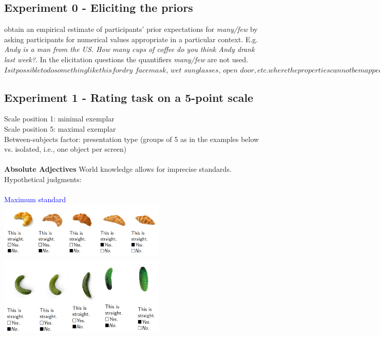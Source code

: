 \documentclass[fleqn,reqno,10pt]{article}
\begin{document}
\subsection{Experiment 0 - Eliciting the priors}

\citet{FrankeScholler2016:Semantic-values} obtain an empirical estimate of participants’ prior expectations for \textit{many/few} by asking participants for numerical values appropriate in a particular context. E.g. \textit{Andy is a man from the US. How many cups of coffee do you think Andy drank last week?}. In the elicitation questions the quantifiers \textit{many/few} are not used. \Rightarrow$
Is it possible to do something like this for \textit{dry facemask, wet sunglasses, open door}, etc. where the properties cannot be mapped onto a numerical scale?$

\subsection{Experiment 1 - Rating task on a 5-point scale}
Scale position 1: minimal exemplar\\
Scale position 5: maximal exemplar\\
Between-subjects factor: presentation type (groups of 5 as in the examples below vs. isolated, i.e., one object per screen)\\
\\
\textbf{Absolute Adjectives} World knowledge allows for imprecise standards. Hypothetical judgments:\\
\\
\textcolor{blue}{Maximum standard}\\
\includegraphics[width=8cm]{images/this-is_straight_croissant.png}
\\
\includegraphics[width=8cm]{images/this-is_straight_cucumber.png}
\\
\end{document}
